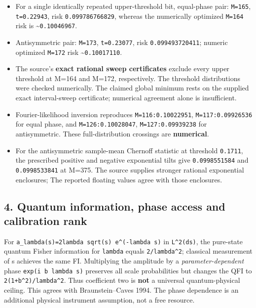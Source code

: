 \documentclass[
  10pt,
  a4paper,
]{article}
\providecommand{\tightlist}{%
  \setlength{\itemsep}{0pt}\setlength{\parskip}{0pt}}
\begin{document}
\begin{itemize}
\tightlist
\item
  For a single identically repeated upper-threshold bit, equal-phase pair: \texttt{M=165}, \texttt{t=0.22943}, risk \texttt{0.099786766829}, whereas the numerically optimized \texttt{M=164} risk is \textasciitilde{}\texttt{0.10046967}.
\item
  Antisymmetric pair: \texttt{M=173}, \texttt{t=0.23077}, risk \texttt{0.099493720411}; numeric optimized \texttt{M=172} risk \textasciitilde{}\texttt{0.10017110}.
\item
  The source's \textbf{exact rational sweep certificates} exclude every upper threshold at M=164 and M=172, respectively. The threshold distributions were checked numerically. The claimed global minimum rests on the supplied exact interval-sweep certificate; numerical agreement alone is insufficient.
\item
  Fourier-likelihood inversion reproduces \texttt{M=116:0.10022951}, \texttt{M=117:0.09926536} for equal phase, and \texttt{M=126:0.10028047}, \texttt{M=127:0.09939238} for antisymmetric. These full-distribution crossings are \textbf{numerical}.
\item
  For the antisymmetric sample-mean Chernoff statistic at threshold \texttt{0.1711}, the prescribed positive and negative exponential tilts give \texttt{0.0998551584} and \texttt{0.0998533841} at M=375. The source supplies stronger rational exponential enclosures; The reported floating values agree with those enclosures.
\end{itemize}

\subsection{4. Quantum information, phase access and calibration rank}\label{quantum-information-phase-access-and-calibration-rank}

For \texttt{a\_lambda(s)=2lambda\ sqrt(s)\ e\^{}(-lambda\ s)} in \texttt{L\^{}2(ds)}, the pure-state quantum Fisher information for \texttt{lambda} equals \texttt{2/lambda\^{}2}; classical measurement of s achieves the same FI. Multiplying the amplitude by a \emph{parameter-dependent} phase \texttt{exp(i\ b\ lambda\ s)} preserves all scale probabilities but changes the QFI to \texttt{2(1+b\^{}2)/lambda\^{}2}. Thus coefficient two is \textbf{not} a universal quantum-physical ceiling. This agrees with Braunstein--Caves 1994. The phase dependence is an additional physical instrument assumption, not a free resource.
\end{document}
